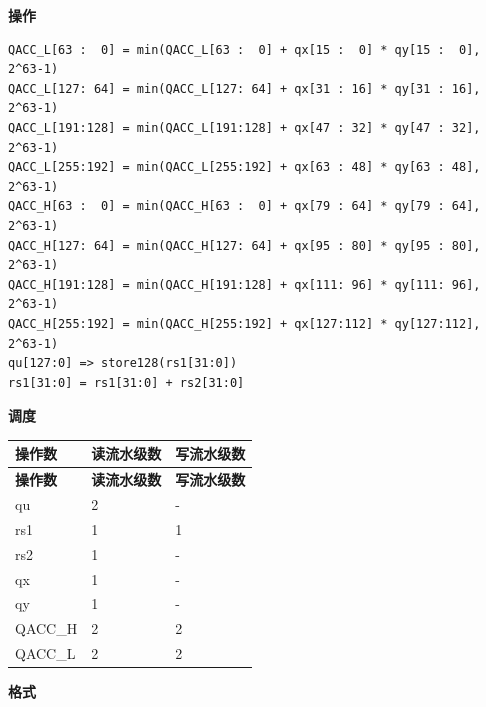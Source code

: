 \textbf{操作}\\
\begin{lstlisting}
QACC_L[63 :  0] = min(QACC_L[63 :  0] + qx[15 :  0] * qy[15 :  0], 2^63-1)
QACC_L[127: 64] = min(QACC_L[127: 64] + qx[31 : 16] * qy[31 : 16], 2^63-1)
QACC_L[191:128] = min(QACC_L[191:128] + qx[47 : 32] * qy[47 : 32], 2^63-1)
QACC_L[255:192] = min(QACC_L[255:192] + qx[63 : 48] * qy[63 : 48], 2^63-1)
QACC_H[63 :  0] = min(QACC_H[63 :  0] + qx[79 : 64] * qy[79 : 64], 2^63-1)
QACC_H[127: 64] = min(QACC_H[127: 64] + qx[95 : 80] * qy[95 : 80], 2^63-1)
QACC_H[191:128] = min(QACC_H[191:128] + qx[111: 96] * qy[111: 96], 2^63-1)
QACC_H[255:192] = min(QACC_H[255:192] + qx[127:112] * qy[127:112], 2^63-1)
qu[127:0] => store128(rs1[31:0])
rs1[31:0] = rs1[31:0] + rs2[31:0]
\end{lstlisting}

\textbf{调度}\\
\begin{longtable}[c]{|l|l|l|}
    \hline
    \rowcolor{lightgray}
    \textbf{操作数} & \textbf{读流水级数} & \textbf{写流水级数} \\\hline
    \endfirsthead
    \hline
    \rowcolor{lightgray}
     \textbf{操作数} & \textbf{读流水级数} & \textbf{写流水级数} \\\hline
    \endhead
    \hline
    \endfoot

    qu & 2 & - \\\hline
    rs1 & 1 & 1 \\\hline
    rs2 & 1 & - \\\hline
     qx & 1 & - \\\hline
     qy & 1 & - \\\hline
     QACC\_H & 2 & 2 \\\hline
     QACC\_L & 2 & 2

\end{longtable}


\textbf{格式}\\

